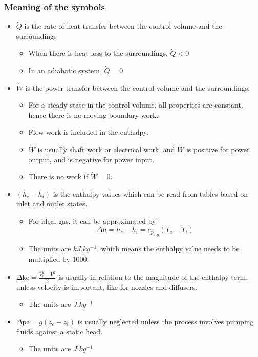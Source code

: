\documentclass[11pt]{article}
\begin{document}
\newpage

\subsubsection{Meaning of the symbols}
\label{sec:org541eaf3}
\begin{itemize}
\item \(\dot{Q}\) is the rate of heat transfer between the control volume and the surroundings
\begin{itemize}
\item When there is heat loss to the surroundings, \(\dot{Q} < 0\)
\item In an adiabatic system, \(\dot{Q} = 0\)
\end{itemize}

\item \(\dot{W}\) is the power transfer between the control volume and the surroundings.
\begin{itemize}
\item For a steady state in the control volume, all properties are constant, hence there is no moving boundary work.
\item Flow work is included in the enthalpy.
\item \(\dot{W}\) is usually shaft work or electrical work, and \(\dot{W}\) is positive for power output, and is negative for power input.
\item There is no work if \(\dot{W} = 0\).
\end{itemize}

\item \(\left(h_e - h_i \right)\) is the enthalpy values which can be read from tables based on inlet and outlet states.
\begin{itemize}
\item For ideal gas, it can be approximated by:
\[\Delta h = h_e - h_i = c_{p_{avg}} \left(T_e - T_i \right)\]

\item The units are \(\unit{kJ.kg^{-1}}\), which means the enthalpy value needs to be multiplied by 1000.
\end{itemize}

\item \(\Delta \text{ke} = \frac{V_e^2 - V_i^2}{2}\) is usually in relation to the magnitude of the enthalpy term, unless velocity is important, like for nozzles and diffusers.
\begin{itemize}
\item The units are \(\unit{J.kg^{-1}}\)
\end{itemize}

\item \(\Delta \text{pe} = g \left(z_e - z_i \right)\) is usually neglected unless the process involves pumping fluids against a static head.
\begin{itemize}
\item The units are \(\unit{J.kg^{-1}}\)
\end{itemize}
\end{itemize}
\end{document}
